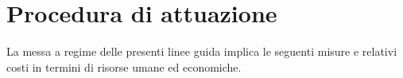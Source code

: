 \section{Procedura di attuazione}
La messa a regime delle presenti linee guida implica le seguenti misure e
relativi costi in termini di risorse umane ed economiche.
